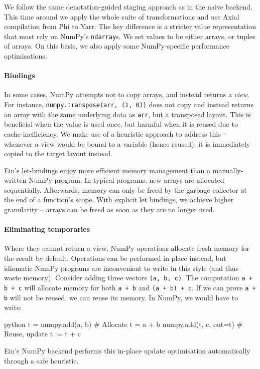 We follow the same denotation-guided staging approach as in the naive backend. This time around we apply the whole suite of transformations and use Axial compilation from Phi to Yarr. The key difference is a stricter value representation that must rely on NumPy's \texttt{ndarray}s. We set values to be either arrays, or tuples of arrays. On this basis, we also apply some NumPy-specific performance optimisations.

\paragraph{Bindings} In some cases, NumPy attempts not to copy arrays, and instead returns a \textit{view}. For instance, \texttt{numpy.transpose(arr, (1, 0))} does not copy and instead returns an array with the same underlying data as \texttt{arr}, but a transposed layout. This is beneficial when the value is used once, but harmful when it is reused due to cache-inefficiency. We make use of a heuristic approach to address this -- whenever a view would be bound to a variable (hence reused), it is immediately copied to the target layout instead. 

Ein's let-bindings enjoy more efficient memory management than a manually-written NumPy program. In typical programs, new arrays are allocated sequentially. Afterwards, memory can only be freed by the garbage collector at the end of a function's scope. With explicit let bindings, we achieve higher granularity -- arrays can be freed as soon as they are no longer used.

\paragraph{Eliminating temporaries} Where they cannot return a view, NumPy operations allocate fresh memory for the result by default. Operations can be performed in-place instead, but idiomatic NumPy programs are inconvenient to write in this style (and thus waste memory). Consider adding three vectors \texttt{(a, b, c)}. The computation \texttt{a + b + c} will allocate memory for both \texttt{a + b} and \texttt{(a + b) + c}. If we can prove \texttt{a + b} will not be reused, we can reuse its memory. In NumPy, we would have to write:
\begin{center}
\begin{cminted}{python}
t = numpy.add(a, b)     # Allocate t = a + b
numpy.add(t, c, out=t)  # Reuse, update t := t + c
\end{cminted}
\end{center}
Ein's NumPy backend performs this in-place update optimisation automatically through a safe heuristic.

